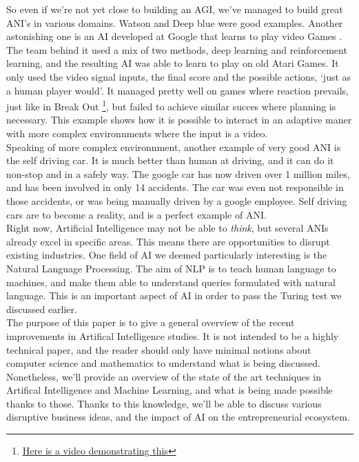 \documentclass[12pt]{article}
\begin{document}
So even if we're not yet close to building an AGI, we've managed to build great
ANI's in various domains. Watson and Deep blue were good examples. Another
astonishing one is an AI developed at Google that learns to play video Games
\cite{Atari}. The team behind it used a mix of two methods, deep learning and
reinforcement learning, and the resulting AI
was able to learn to play on old Atari Games. It only used the video signal
inputs, the final score and the possible actions, \lq just as a human player
would\rq. It managed pretty well on games where reaction prevails, just like in
Break Out \footnote{\href{https://www.youtube.com/watch?v=cjpEIotvwFY}
{Here is a video demonstrating this}}, but failed to achieve similar succes
where planning is necessary. This example shows how it is possible to interact
in an adaptive maner with more complex environnments where the input is a video.
\\

Speaking of more complex environnment, another example of very good ANI is the
self driving car. It is much better than human at driving, and it can do it
non-stop and in a safely way. The google car has now driven over 1 million miles,
and has been involved in only 14 accidents. The car was even not responsible in
those accidents, or was being manually driven by a google employee. Self driving
cars are to become a reality, and is a perfect example of ANI.
\\

Right now, Artificial Intelligence may not be able to {\em think}, but several
ANIs already excel in specific areas. This means there are opportunities to
disrupt existing industries. One field of AI we deemed particularly interesting
is the Natural Language Processing. The aim of NLP is to teach human language to
machines, and make them able to understand queries formulated with natural
language. This is an important aspect of AI in order to pass the Turing test we
discussed earlier.
\\


The purpose of this paper is to give a general overview of the recent
improvements in Artifical Intelligence studies. It is not intended to be a
highly technical paper, and the reader should only have minimal notions about
computer science and mathematics to understand what is being discussed.
Nonetheless, we'll provide an overview of the state of the art
techniques in Artifical Intelligence and Machine Learning, and what is being
made possible thanks to those. Thanks to this knowledge, we'll be able to
discuss various disruptive business ideas, and the impact of AI on the
entrepreneurial ecosystem.
\\
\end{document}
